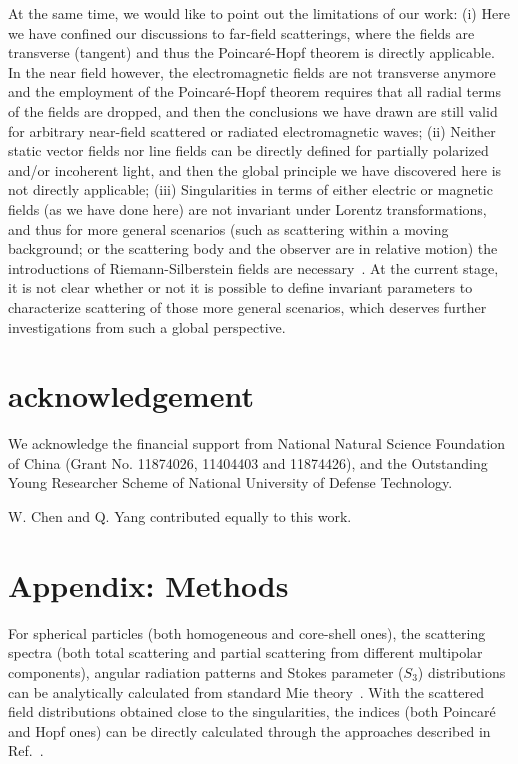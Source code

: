 \documentclass[aps,twocolumn,superscriptaddress]{revtex4-1}
\begin{document}
At the same time, we would like to point out the limitations of our work: (i) Here we have confined our discussions to far-field scatterings, where the fields are transverse (tangent) and thus the Poincar\'{e}-Hopf theorem is directly applicable. In the near field however, the electromagnetic fields are not transverse anymore and the employment of the Poincar\'{e}-Hopf theorem requires that all radial terms of the fields are dropped, and then the conclusions we have drawn are still valid for arbitrary near-field scattered or radiated electromagnetic waves; (ii) Neither static vector fields nor line fields can be directly defined for partially polarized and/or incoherent light, and then the global principle we have discovered here is not directly applicable;  (iii) Singularities in terms of either electric or magnetic fields (as we have done here) are not invariant under Lorentz transformations, and thus for more general scenarios (such as scattering within a moving background; or the scattering body and the observer are in relative motion) the introductions of Riemann-Silberstein fields are necessary~\cite{BIALYNICKI-BIRULA_2003_Phys.Rev.A_Vortex,BERRY_2004_J.Opt.A:PureAppl.Opt._Riemann}. At the current stage, it is not clear whether or not it is possible to define invariant parameters to characterize scattering of those more general scenarios, which deserves further investigations from such a global perspective.

\section*{acknowledgement}
We acknowledge the financial support from National Natural Science
Foundation of China (Grant No. 11874026, 11404403 and 11874426), and the Outstanding Young Researcher Scheme of National University of Defense Technology.

W. Chen and Q. Yang contributed equally to this work.

\section*{Appendix: Methods}

For spherical particles (both homogeneous and core-shell ones), the scattering spectra (both total scattering and partial scattering from different multipolar components), angular radiation patterns and Stokes parameter ($S_3$) distributions can be analytically calculated from standard Mie theory~\cite{Bohren1983_book}. With the scattered field distributions obtained close to the singularities, the indices (both Poincar\'{e} and Hopf ones) can be directly calculated through the approaches described in Ref.~\cite{BERRY_2004_J.Opt.PureAppl.Opt._Index}.
\end{document}
